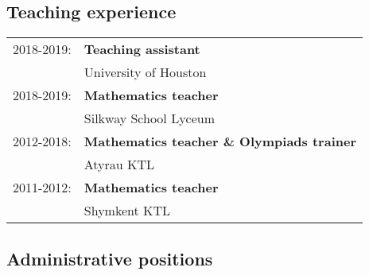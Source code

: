 \documentclass[10pt,a4paper]{article}
\begin{document}
		\subsection*{Teaching experience}
			\begin{tabular}{p{}p{}}
				2018-2019:							&\textbf{Teaching assistant} \\
																&University of Houston\\
				2018-2019:							&\textbf{Mathematics teacher} \\
																 &Silkway School Lyceum\\
				2012-2018:							&\textbf{Mathematics teacher \& Olympiads trainer}\\
																	&Atyrau KTL\\
				2011-2012: 							& \textbf{Mathematics teacher}\\
																	 &Shymkent KTL\\
			\end{tabular}
		
		\subsection*{Administrative positions}
\end{document}
